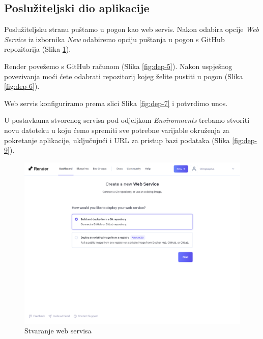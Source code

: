         \subsection{Poslužiteljski dio aplikacije}

        \begin{packed_item}

            \item Poslužiteljsku stranu puštamo u pogon kao web servis. Nakon odabira opcije \emph{Web Service} iz izbornika \emph{New} odabiremo opciju puštanja u pogon s GitHub repozitorija (Slika \ref{fig:dep-4}).
            \item Render povežemo s GitHub računom (Slika \ref{fig:dep-5}). Nakon uspješnog povezivanja moći ćete odabrati repozitorij kojeg želite pustiti u pogon (Slika \ref{fig:dep-6}).
            \item Web servis konfiguriramo prema slici Slika \ref{fig:dep-7} i potvrdimo unos.
            \item U postavkama stvorenog servisa pod odjeljkom \emph{Environments} trebamo stvoriti novu datoteku u koju ćemo spremiti sve potrebne varijable okruženja za pokretanje aplikacije, uključujući i URL za pristup bazi podataka (Slika \ref{fig:dep-9}).
            
        \end{packed_item}

        \begin{figure}[htp]
			\includegraphics[scale=0.15]{slike/deploy_4.png}
			\centering
			\caption{Stvaranje web servisa}
            \label{fig:dep-4}
		\end{figure}

